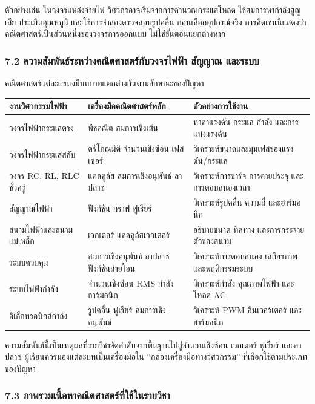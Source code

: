 ตัวอย่างเช่น ในวงจรแหล่งจ่ายไฟ วิศวกรอาจเริ่มจากการคำนวณกระแสโหลด ใช้สมการหากำลังสูญเสีย ประเมินอุณหภูมิ และใช้การจำลองตรวจสอบรูปคลื่น ก่อนเลือกอุปกรณ์จริง การคิดเช่นนี้แสดงว่าคณิตศาสตร์เป็นส่วนหนึ่งของวงจรการออกแบบ ไม่ใช่ขั้นตอนแยกต่างหาก

\subsubsection{7.2 ความสัมพันธ์ระหว่างคณิตศาสตร์กับวงจรไฟฟ้า สัญญาณ และระบบ}

คณิตศาสตร์แต่ละแขนงมีบทบาทแตกต่างกันตามลักษณะของปัญหา

\begin{table}[htbp]
    \centering
    \begin{tabular}{l l l}
        \hline
        \textbf{งานวิศวกรรมไฟฟ้า} & \textbf{เครื่องมือคณิตศาสตร์หลัก} & \textbf{ตัวอย่างการใช้งาน} \\
        \hline
        วงจรไฟฟ้ากระแสตรง & พีชคณิต สมการเชิงเส้น & หาค่าแรงดัน กระแส กำลัง และการแบ่งแรงดัน \\
        วงจรไฟฟ้ากระแสสลับ & ตรีโกณมิติ จำนวนเชิงซ้อน เฟสเซอร์ & วิเคราะห์ขนาดและมุมเฟสของแรงดัน/กระแส \\
        วงจร RC, RL, RLC ชั่วครู่ & แคลคูลัส สมการเชิงอนุพันธ์ ลาปลาซ & วิเคราะห์การชาร์จ การคายประจุ และการตอบสนองเวลา \\
        สัญญาณไฟฟ้า & ฟังก์ชัน กราฟ ฟูเรียร์ & วิเคราะห์รูปคลื่น ความถี่ และฮาร์มอนิก \\
        สนามไฟฟ้าและสนามแม่เหล็ก & เวกเตอร์ แคลคูลัสเวกเตอร์ & อธิบายขนาด ทิศทาง และการกระจายตัวของสนาม \\
        ระบบควบคุม & สมการเชิงอนุพันธ์ ลาปลาซ ฟังก์ชันถ่ายโอน & วิเคราะห์การตอบสนอง เสถียรภาพ และพฤติกรรมระบบ \\
        ระบบไฟฟ้ากำลัง & จำนวนเชิงซ้อน RMS กำลัง ฮาร์มอนิก & วิเคราะห์กำลัง คุณภาพไฟฟ้า และโหลด AC \\
        อิเล็กทรอนิกส์กำลัง & รูปคลื่น ฟูเรียร์ สมการเชิงอนุพันธ์ & วิเคราะห์ PWM อินเวอร์เตอร์ และฮาร์มอนิก \\
        \hline
    \end{tabular}
\end{table}

ความสัมพันธ์นี้เป็นเหตุผลที่รายวิชาจัดลำดับจากพื้นฐานไปสู่จำนวนเชิงซ้อน เวกเตอร์ ฟูเรียร์ และลาปลาซ ผู้เรียนควรมองแต่ละบทเป็นเครื่องมือใน “กล่องเครื่องมือทางวิศวกรรม” ที่เลือกใช้ตามประเภทของปัญหา

\subsubsection{7.3 ภาพรวมเนื้อหาคณิตศาสตร์ที่ใช้ในรายวิชา}

